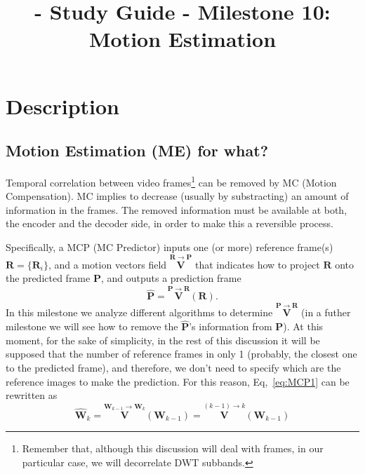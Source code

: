 
\title{\SM{} - Study Guide - Milestone 10: Motion Estimation}

\maketitle

\tableofcontents

\section{Description}

\subsection{Motion Estimation (ME) for what?}
Temporal correlation between video frames\footnote{Remember that,
  although this discussion will deal with frames, in our particular
  case, we will decorrelate DWT subbands.} can be removed by MC
(Motion Compensation). MC implies to decrease (usually by
substracting) an amount of information in the frames. The removed
information must be available at both, the encoder and the decoder
side, in order to make this a reversible process.

Specifically, a MCP (MC Predictor) inputs one (or more) reference
frame(s) ${\mathbf R}=\{{\mathbf R}_i\}$, and a motion vectors field
$\overset{{\mathbf R}\rightarrow{\mathbf P}}{\mathbf V}$ that
indicates how to project ${\mathbf R}$ onto the predicted frame ${\mathbf P}$, and outputs
a prediction frame
\begin{equation}
  \hat{{\mathbf P}} =  \overset{{\mathbf P}\rightarrow {\mathbf R}}{\mathbf V}({\mathbf R}).
  \label{eq:MCP1}
\end{equation}
In this milestone we analyze different algorithms to determine
$\overset{{\mathbf P}\rightarrow {\mathbf R}}{\mathbf V}$ (in a futher
milestone we will see how to remove the $\hat{{\mathbf P}}$'s
information from ${\mathbf P}$). At this moment, for the sake of
simplicity, in the rest of this discussion it will be supposed that the
number of reference frames in only 1 (probably, the closest one to the
predicted frame), and therefore, we don't need to specify which are
the reference images to make the prediction. For this reason,
Eq,~\ref{eq:MCP1} can be rewritten as
\begin{equation}
  \hat{\mathbf W}_k = \overset{{\mathbf W}_{k-1}\rightarrow {\mathbf
  W}_{k}}{\mathbf V}({\mathbf W}_{k-1}) = \overset{(k-1)\rightarrow
          k}{\mathbf V}({\mathbf W}_{k-1})
  \label{eq:MCP2}
\end{equation}

